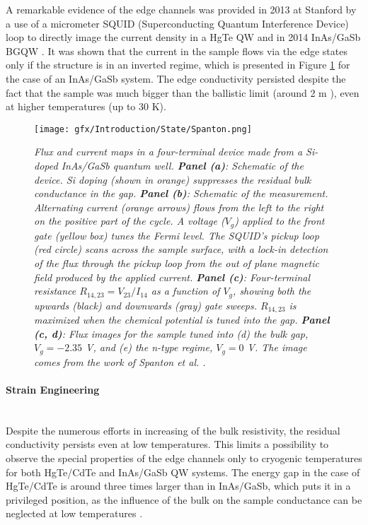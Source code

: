 \documentclass[titlepage,a4paper]{book}
\newcommand{\wciecie}{\quad\phantom{v}}
\newcommand{\myparagraph}[1]{\paragraph{#1}\mbox{}\\}
\begin{document}
A remarkable evidence of the edge channels was provided in 2013 at Stanford by a use of a micrometer SQUID (Superconducting Quantum Interference Device) loop \cite{Huber_State} to directly image the current density in a HgTe QW \cite{Nowack_State} and in 2014 InAs/GaSb BGQW \cite{Spanton_State}. It was shown that the current in the sample flows via the edge states only if the structure is in an inverted regime, which is presented in Figure \ref{fig:Spanton_State} for the case of an InAs/GaSb system. The edge conductivity persisted despite the fact that the sample was much bigger than the ballistic limit (around 2 \textmu m \cite{Knez2_State}), even at higher temperatures (up to 30 K). 

\begin{figure}[ht]
	\centering
	\texttt{[image: gfx/Introduction/State/Spanton.png]}
	\vspace{-10pt}
	\caption{\textit{Flux and current maps in a four-terminal device made from a Si-doped InAs/GaSb quantum well. \textbf{Panel (a)}: Schematic of the device. Si doping (shown in orange) suppresses the residual bulk conductance in the gap. \textbf{Panel (b)}: Schematic of the measurement. Alternating current (orange arrows) flows from the left to the right on the positive part of the cycle. A voltage ($V_g$) applied to the front gate (yellow box) tunes the Fermi level. The SQUID's pickup loop (red circle) scans across the sample surface, with a lock-in detection of the flux through the pickup loop from the out of plane magnetic field produced by the applied current. \textbf{Panel (c)}: Four-terminal resistance $R_{14,23} = V_{23}/I_{14}$ as a function of $V_g$, showing both the upwards (black) and downwards (gray) gate sweeps. $R_{14,23}$ is maximized when the chemical potential is tuned into the gap. \textbf{Panel (c, d)}: Flux images for the sample tuned into (d) the bulk gap, $V_g = -2.35$ V, and (e) the n-type regime, $V_g = 0$ V. The image comes from the work of Spanton \textit{et al.} \cite{Spanton_State}.}}
	\label{fig:Spanton_State}
\end{figure} 

\myparagraph{Strain Engineering}
\wciecie
Despite the numerous efforts in increasing of the bulk resistivity, the residual conductivity persists even at low temperatures. This limits a possibility to observe the special properties of the edge channels only to cryogenic temperatures for both HgTe/CdTe and InAs/GaSb QW systems. The energy gap in the case of HgTe/CdTe is around three times larger than in InAs/GaSb, which puts it in a privileged position, as the influence of the bulk on the sample conductance can be neglected at low temperatures \cite{Konig_Topology}. 
\end{document}

